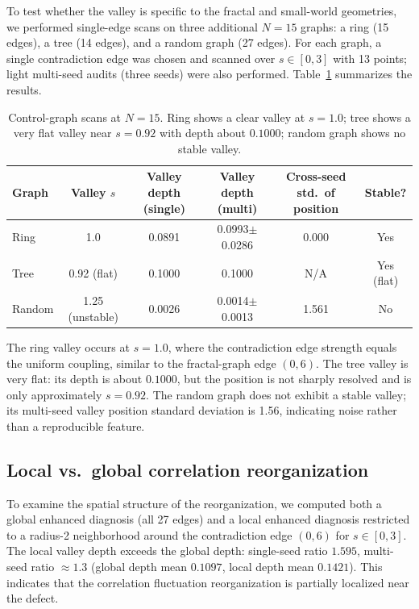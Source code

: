 \documentclass[aps,prb,reprint,superscriptaddress]{revtex4-2}
\begin{document}
To test whether the valley is specific to the fractal and small-world geometries, we performed single-edge scans on three additional $N=15$ graphs: a ring (15 edges), a tree (14 edges), and a random graph (27 edges). For each graph, a single contradiction edge was chosen and scanned over $s\in[0,3]$ with 13 points; light multi-seed audits (three seeds) were also performed. Table~\ref{tab:control_graphs} summarizes the results.

\begin{table}[t]
\centering
\caption{Control-graph scans at $N=15$. Ring shows a clear valley at $s=1.0$; tree shows a very flat valley near $s=0.92$ with depth about $0.1000$; random graph shows no stable valley.}
\label{tab:control_graphs}
\begin{tabular}{lccccc}
\toprule
Graph & Valley $s$ & Valley depth (single) & Valley depth (multi) & Cross-seed std.\ of position & Stable? \\
\midrule
Ring & 1.0 & 0.0891 & 0.0993$\pm$0.0286 & 0.000 & Yes \\
Tree & 0.92 (flat) & 0.1000 & 0.1000 & N/A & Yes (flat) \\
Random & 1.25 (unstable) & 0.0026 & 0.0014$\pm$0.0013 & 1.561 & No \\
\bottomrule
\end{tabular}
\end{table}

The ring valley occurs at $s=1.0$, where the contradiction edge strength equals the uniform coupling, similar to the fractal-graph edge $(0,6)$. The tree valley is very flat: its depth is about $0.1000$, but the position is not sharply resolved and is only approximately $s=0.92$. The random graph does not exhibit a stable valley; its multi-seed valley position standard deviation is 1.56, indicating noise rather than a reproducible feature.

\subsection{Local vs.\ global correlation reorganization}
\label{sec:local_global}

To examine the spatial structure of the reorganization, we computed both a global enhanced diagnosis (all 27 edges) and a local enhanced diagnosis restricted to a radius-2 neighborhood around the contradiction edge $(0,6)$ for $s\in[0,3]$. The local valley depth exceeds the global depth: single-seed ratio $1.595$, multi-seed ratio $\approx1.3$ (global depth mean $0.1097$, local depth mean $0.1421$). This indicates that the correlation fluctuation reorganization is partially localized near the defect.
\end{document}
